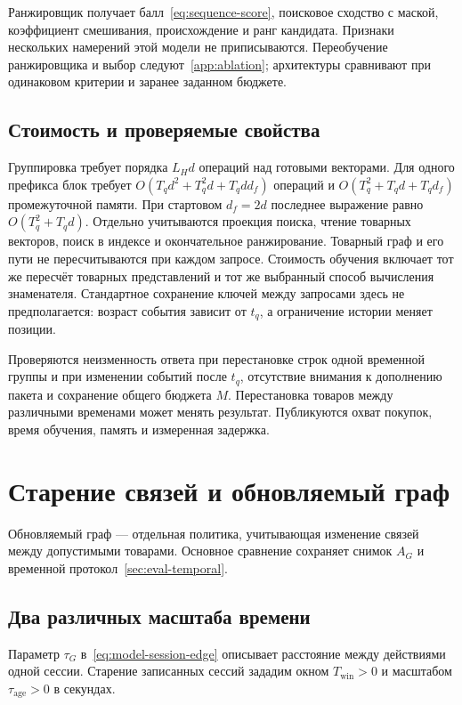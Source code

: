 \documentclass[12pt,a4paper]{article}
\theoremstyle{plainru}
\begin{document}
Ранжировщик получает балл~\eqref{eq:sequence-score}, поисковое
сходство с маской, коэффициент смешивания, происхождение и ранг кандидата.
Признаки нескольких намерений этой модели не приписываются.
Переобучение ранжировщика и выбор следуют~\ref{app:ablation};
архитектуры сравнивают при одинаковом критерии и заранее заданном бюджете.

\subsection{Стоимость и проверяемые свойства}
\label{sec:sequence-cost}

Группировка требует порядка $L_Hd$ операций над готовыми векторами.
Для одного префикса блок требует
$O(T_qd^2+T_q^2d+T_qdd_f)$ операций
и $O(T_q^2+T_qd+T_qd_f)$ промежуточной памяти.
При стартовом $d_f=2d$ последнее выражение равно $O(T_q^2+T_qd)$.
Отдельно учитываются проекция поиска, чтение товарных векторов,
поиск в индексе и окончательное ранжирование.
Товарный граф и его пути не пересчитываются при каждом запросе.
Стоимость обучения включает тот же пересчёт товарных представлений
и тот же выбранный способ вычисления знаменателя.
Стандартное сохранение ключей между запросами здесь не предполагается:
возраст события зависит от $t_q$, а ограничение истории меняет позиции.

Проверяются неизменность ответа при перестановке строк одной
временной группы и при изменении событий после $t_q$,
отсутствие внимания к дополнению пакета и сохранение общего бюджета $M$.
Перестановка товаров между различными временами может менять результат.
Публикуются охват покупок, время обучения, память и измеренная задержка.

\section{Старение связей и обновляемый граф}\label{sec:freshness}

Обновляемый граф --- отдельная политика, учитывающая изменение связей
между допустимыми товарами. Основное сравнение сохраняет снимок $A_G$
и временной протокол~\ref{sec:eval-temporal}.

\subsection{Два различных масштаба времени}\label{sec:freshness-weights}

Параметр $\tau_G$ в~\eqref{eq:model-session-edge} описывает расстояние
между действиями одной сессии. Старение записанных сессий зададим
окном $T_{\mathrm{win}}>0$ и масштабом $\tau_{\mathrm{age}}>0$ в секундах.
\end{document}
